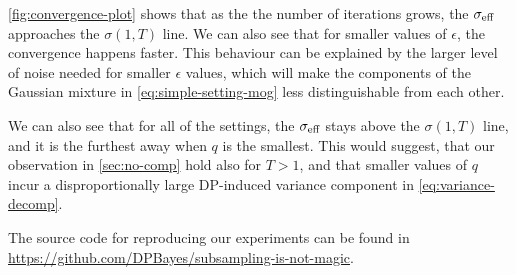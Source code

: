 \documentclass{article}
\theoremstyle{plain}
\theoremstyle{definition}
\theoremstyle{remark}
\begin{document}
\cref{fig:convergence-plot} shows that as the the number of iterations grows,
the $\sigma_{\text{eff}}$ approaches the $\sigma(1, T)$ line. We can also see that for
smaller values of $\epsilon$, the convergence happens faster. This behaviour can be
explained by the larger level of noise needed for smaller $\epsilon$
values, which will make the components of the Gaussian mixture in
\cref{eq:simple-setting-mog} less distinguishable from each other.

We can also see that for all of the settings, the $\sigma_{\text{eff}}$ stays above the
$\sigma(1, T)$ line, and it is the furthest away when $q$ is the smallest. This
would suggest, that our observation in \cref{sec:no-comp} hold also for $T > 1$,
and that smaller values of $q$ incur a disproportionally large DP-induced
variance component in \cref{eq:variance-decomp}.

The source code for reproducing our experiments can be found in 
\url{https://github.com/DPBayes/subsampling-is-not-magic}.


\end{document}
